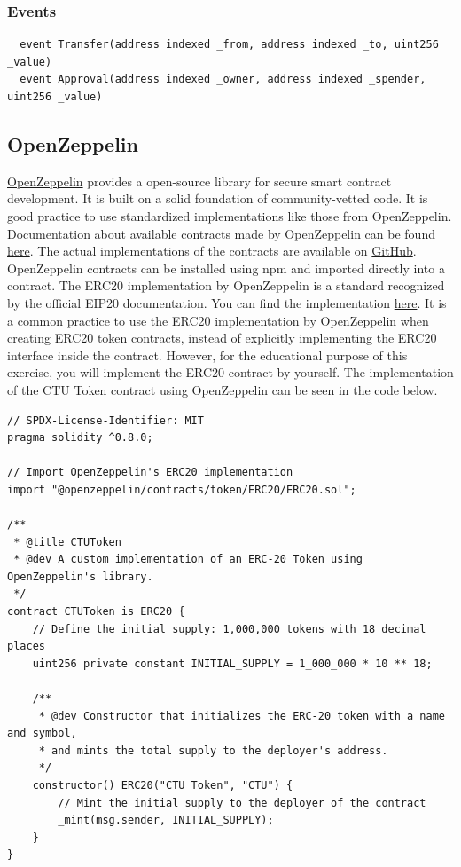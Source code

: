 \documentclass[12pt]{article}
\begin{document}
\subsubsection*{Events}

\begin{verbatim}
  event Transfer(address indexed _from, address indexed _to, uint256 _value)
  event Approval(address indexed _owner, address indexed _spender, uint256 _value)  
\end{verbatim}

\subsection*{OpenZeppelin}

\href{https://www.openzeppelin.com/}{OpenZeppelin} provides a open-source library for secure smart contract development. It is built on a solid
foundation of community-vetted code. It is good practice to use standardized implementations like those from OpenZeppelin. Documentation about available contracts made by OpenZeppelin can be found \href{https://docs.openzeppelin.com/contracts/4.x/}{here}. The actual implementations of the contracts are available on \href{https://github.com/OpenZeppelin/openzeppelin-contracts}{GitHub}. OpenZeppelin contracts can be installed using npm and imported directly into a contract. The ERC20 implementation by OpenZeppelin is a standard recognized by the official EIP20 documentation. You can find the implementation \href{https://github.com/OpenZeppelin/openzeppelin-contracts/blob/master/contracts/token/ERC20/ERC20.sol}{here}. It is a common practice to use the ERC20 implementation by OpenZeppelin when creating ERC20 token contracts, instead of explicitly implementing the ERC20 interface inside the contract. However, for the educational purpose of this exercise, you will implement the ERC20 contract by yourself. The implementation of the CTU Token contract using OpenZeppelin can be seen in the code below.

\begin{verbatim}
// SPDX-License-Identifier: MIT
pragma solidity ^0.8.0;

// Import OpenZeppelin's ERC20 implementation
import "@openzeppelin/contracts/token/ERC20/ERC20.sol";

/**
 * @title CTUToken
 * @dev A custom implementation of an ERC-20 Token using OpenZeppelin's library.
 */
contract CTUToken is ERC20 {
    // Define the initial supply: 1,000,000 tokens with 18 decimal places
    uint256 private constant INITIAL_SUPPLY = 1_000_000 * 10 ** 18;

    /**
     * @dev Constructor that initializes the ERC-20 token with a name and symbol,
     * and mints the total supply to the deployer's address.
     */
    constructor() ERC20("CTU Token", "CTU") {
        // Mint the initial supply to the deployer of the contract
        _mint(msg.sender, INITIAL_SUPPLY);
    }
}
\end{verbatim}
\end{document}
